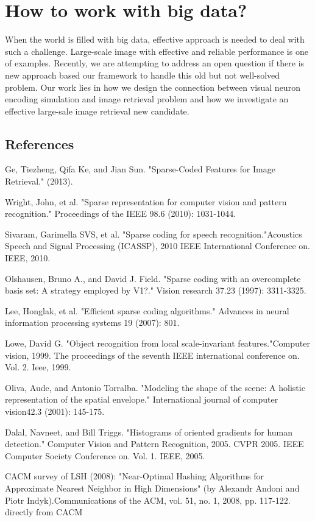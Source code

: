 \documentclass[letterpaper]{article}
\begin{document}
\section{How to work with big data?}
When the world is filled with big data, effective approach is needed to deal with such a challenge.  Large-scale image with effective and reliable performance is one of examples. Recently, we are attempting to address an open question if there is new approach based our framework to handle this old but not well-solved problem. Our work lies in how we design the connection between visual neuron encoding simulation and image retrieval problem and how we investigate an effective large-sale image retrieval new candidate.

\subsection{References} 
Ge, Tiezheng, Qifa Ke, and Jian Sun. "Sparse-Coded Features for Image Retrieval." (2013).

Wright, John, et al. "Sparse representation for computer vision and pattern recognition." Proceedings of the IEEE 98.6 (2010): 1031-1044.

Sivaram, Garimella SVS, et al. "Sparse coding for speech recognition."Acoustics Speech and Signal Processing (ICASSP), 2010 IEEE International Conference on. IEEE, 2010.

Olshausen, Bruno A., and David J. Field. "Sparse coding with an overcomplete basis set: A strategy employed by V1?." Vision research 37.23 (1997): 3311-3325.

Lee, Honglak, et al. "Efficient sparse coding algorithms." Advances in neural information processing systems 19 (2007): 801.

Lowe, David G. "Object recognition from local scale-invariant features."Computer vision, 1999. The proceedings of the seventh IEEE international conference on. Vol. 2. Ieee, 1999.

Oliva, Aude, and Antonio Torralba. "Modeling the shape of the scene: A holistic representation of the spatial envelope." International journal of computer vision42.3 (2001): 145-175.

Dalal, Navneet, and Bill Triggs. "Histograms of oriented gradients for human detection." Computer Vision and Pattern Recognition, 2005. CVPR 2005. IEEE Computer Society Conference on. Vol. 1. IEEE, 2005.

CACM survey of LSH (2008): "Near-Optimal Hashing Algorithms for Approximate Nearest Neighbor in High Dimensions" (by Alexandr Andoni and Piotr Indyk).Communications of the ACM, vol. 51, no. 1, 2008, pp. 117-122. 
directly from CACM 
\end{document}
